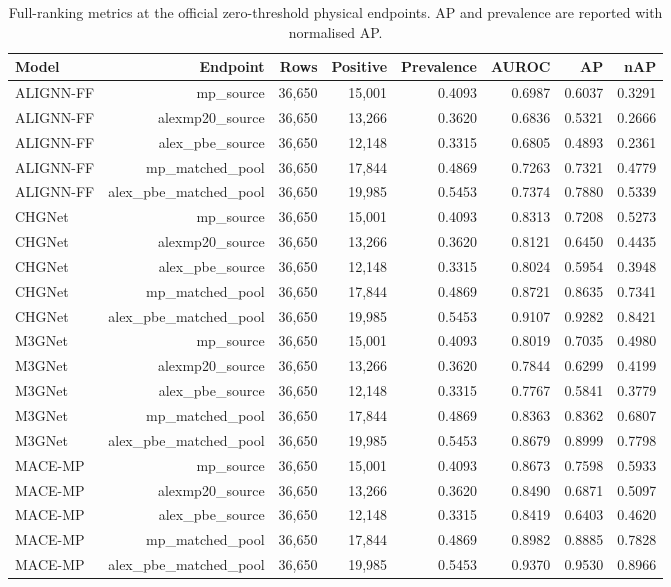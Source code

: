 \begin{table}[H]
\centering
\sitablefont
\caption{Full-ranking metrics at the official zero-threshold physical endpoints. AP and prevalence are reported with normalised AP.}
\label{tab:v3-metrics}
\begin{adjustbox}{max width=\linewidth}
\begin{tabular}{@{}lrrrrrrr@{}}
\toprule
Model & Endpoint & Rows & Positive & Prevalence & AUROC & AP & nAP \\
\midrule
ALIGNN-FF & mp\_source & 36,650 & 15,001 & 0.4093 & 0.6987 & 0.6037 & 0.3291 \\
ALIGNN-FF & alexmp20\_source & 36,650 & 13,266 & 0.3620 & 0.6836 & 0.5321 & 0.2666 \\
ALIGNN-FF & alex\_pbe\_source & 36,650 & 12,148 & 0.3315 & 0.6805 & 0.4893 & 0.2361 \\
ALIGNN-FF & mp\_matched\_pool & 36,650 & 17,844 & 0.4869 & 0.7263 & 0.7321 & 0.4779 \\
ALIGNN-FF & alex\_pbe\_matched\_pool & 36,650 & 19,985 & 0.5453 & 0.7374 & 0.7880 & 0.5339 \\
CHGNet & mp\_source & 36,650 & 15,001 & 0.4093 & 0.8313 & 0.7208 & 0.5273 \\
CHGNet & alexmp20\_source & 36,650 & 13,266 & 0.3620 & 0.8121 & 0.6450 & 0.4435 \\
CHGNet & alex\_pbe\_source & 36,650 & 12,148 & 0.3315 & 0.8024 & 0.5954 & 0.3948 \\
CHGNet & mp\_matched\_pool & 36,650 & 17,844 & 0.4869 & 0.8721 & 0.8635 & 0.7341 \\
CHGNet & alex\_pbe\_matched\_pool & 36,650 & 19,985 & 0.5453 & 0.9107 & 0.9282 & 0.8421 \\
M3GNet & mp\_source & 36,650 & 15,001 & 0.4093 & 0.8019 & 0.7035 & 0.4980 \\
M3GNet & alexmp20\_source & 36,650 & 13,266 & 0.3620 & 0.7844 & 0.6299 & 0.4199 \\
M3GNet & alex\_pbe\_source & 36,650 & 12,148 & 0.3315 & 0.7767 & 0.5841 & 0.3779 \\
M3GNet & mp\_matched\_pool & 36,650 & 17,844 & 0.4869 & 0.8363 & 0.8362 & 0.6807 \\
M3GNet & alex\_pbe\_matched\_pool & 36,650 & 19,985 & 0.5453 & 0.8679 & 0.8999 & 0.7798 \\
MACE-MP & mp\_source & 36,650 & 15,001 & 0.4093 & 0.8673 & 0.7598 & 0.5933 \\
MACE-MP & alexmp20\_source & 36,650 & 13,266 & 0.3620 & 0.8490 & 0.6871 & 0.5097 \\
MACE-MP & alex\_pbe\_source & 36,650 & 12,148 & 0.3315 & 0.8419 & 0.6403 & 0.4620 \\
MACE-MP & mp\_matched\_pool & 36,650 & 17,844 & 0.4869 & 0.8982 & 0.8885 & 0.7828 \\
MACE-MP & alex\_pbe\_matched\_pool & 36,650 & 19,985 & 0.5453 & 0.9370 & 0.9530 & 0.8966 \\
\bottomrule
\end{tabular}
\end{adjustbox}
\end{table}


